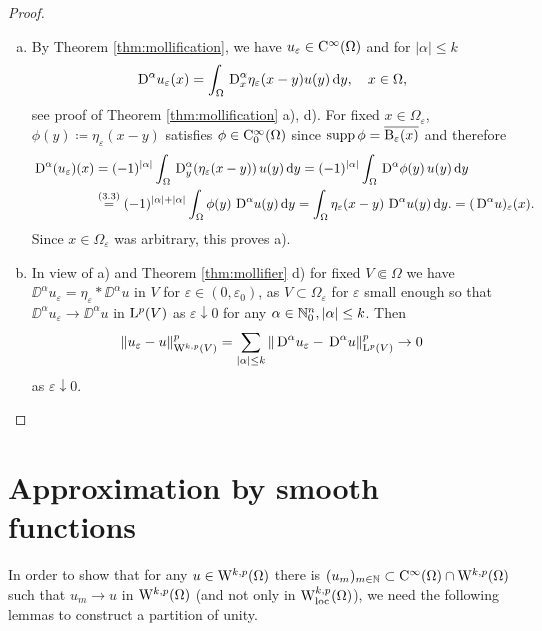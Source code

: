 \begin{proof}
  \begin{enumerate}[a)]
    \item By Theorem \ref{thm:mollification}, we have $u_\varepsilon \in \mathrm{C}^\infty(\Omega)$ and for $|\alpha| \leq k$
  $$
    \,{\operatorname{D}}^\alpha u_\varepsilon(x) = \int_\Omega \,{\operatorname{D}}_x^\alpha \eta_\varepsilon(x - y) u(y) \, {\operatorname{d}\!{y}}, \quad x \in \Omega,
  $$
    see proof of Theorem \ref{thm:mollification} a), d).
    For fixed $x \in \Omega_\varepsilon$, $\phi(y) \coloneqq \eta_\varepsilon(x - y)$ satisfies $\phi \in \mathrm{C}_0^\infty(\Omega)$ since $\operatorname{supp} \phi = \overline{\mathrm{B}_\varepsilon(x)}$ and therefore
    \begin{align*}
      \,{\operatorname{D}}^\alpha (u_\varepsilon)(x) 
      &= (-1)^{|\alpha|} \int_\Omega \,{\operatorname{D}}_y^\alpha (\eta_\varepsilon (x - y))\, u(y) \, {\operatorname{d}\!{y}}
      = (-1)^{|\alpha|} \int_\Omega \,{\operatorname{D}}^\alpha \phi(y) \, u(y) \, {\operatorname{d}\!{y}} \\
      &\overset{(3.3)}{=} (-1)^{|\alpha| + |\alpha|} \int_\Omega \phi(y) \, \,{\operatorname{D}}^\alpha u(y) \, {\operatorname{d}\!{y}}
      = \int_\Omega \eta_\varepsilon(x - y)\, \,{\operatorname{D}}^\alpha u(y) \, {\operatorname{d}\!{y}}.
      = (\,{\operatorname{D}}^\alpha u)_\varepsilon(x).
    \end{align*}
    Since $x \in \Omega_\varepsilon$ was arbitrary, this proves a).

  \item In view of a) and Theorem \ref{thm:mollifier} d) for fixed $V \Subset \Omega$ we have $\DD^\alpha u_\varepsilon = \eta_\varepsilon \ast \DD^\alpha u$ in $V$ for $\varepsilon \in (0,\varepsilon_0)$, as $V \subset \Omega_\varepsilon$ for $\varepsilon$ small enough so that $\DD^\alpha u_\varepsilon \to \DD^\alpha u$ in $\mathrm{L}^p(V)$ as $\varepsilon \downarrow 0$ for any $\alpha \in \mathbb{N}_0^n, |\alpha| \leq k$.
     Then
     $$
     \|u_\varepsilon - u\|^p_{\mathrm{W}^{k,p}(V)} = \sum_{|\alpha| \leq k} \|\,{\operatorname{D}}^\alpha u_\varepsilon - \,{\operatorname{D}}^\alpha u\|_{\mathrm{L}^p(V)}^p \to 0
     $$
     as $\varepsilon \downarrow 0$.
 \end{enumerate}
\end{proof}

\section{Approximation by smooth functions}

In order to show that for any $u \in \mathrm{W}^{k,p}(\Omega)$ there is $(u_m)_{m \in \mathbb{N}} \subset \mathrm{C}^\infty(\Omega) \cap \mathrm{W}^{k,p}(\Omega)$ such that $u_m \to u$ in $\mathrm{W}^{k,p}(\Omega)$ (and not only in $\mathrm{W}^{k,p}_{\operatorname{loc}}(\Omega)$), we need the following lemmas to construct a partition of unity.

